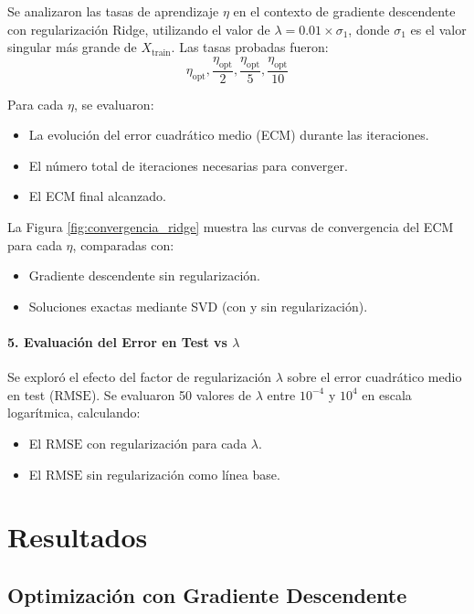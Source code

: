 \documentclass{tp02}
\begin{document}
Se analizaron las tasas de aprendizaje \(\eta\) en el contexto de 
gradiente descendente con regularización Ridge, utilizando el valor de 
\(\lambda = 0.01 \times \sigma_1\), donde \(\sigma_1\) es el valor 
singular más grande de \(X_{\text{train}}\). Las tasas probadas fueron:
\[
\eta_{\text{opt}}, \frac{\eta_{\text{opt}}}{2}, \frac{\eta_{\text{opt}}}{5}, 
\frac{\eta_{\text{opt}}}{10}
\]

Para cada \(\eta\), se evaluaron:
\begin{itemize}
    \item La evolución del error cuadrático medio (ECM) durante las 
    iteraciones.
    \item El número total de iteraciones necesarias para converger.
    \item El ECM final alcanzado.
\end{itemize}

La Figura \ref{fig:convergencia_ridge} muestra las curvas de 
convergencia del ECM para cada \(\eta\), comparadas con:
\begin{itemize}
    \item Gradiente descendente sin regularización.
    \item Soluciones exactas mediante SVD (con y sin regularización).
\end{itemize}


\paragraph{5. Evaluación del Error en Test vs \(\lambda\)}

Se exploró el efecto del factor de regularización \(\lambda\) sobre el 
error cuadrático medio en test (\(\text{RMSE}\)). Se evaluaron 50 valores 
de \(\lambda\) entre \(10^{-4}\) y \(10^4\) en escala logarítmica, 
calculando:
\begin{itemize}
    \item El \(\text{RMSE}\) con regularización para cada \(\lambda\).
    \item El \(\text{RMSE}\) sin regularización como línea base.
\end{itemize}

\section{Resultados}

\subsection{Optimización con Gradiente Descendente}
\end{document}
